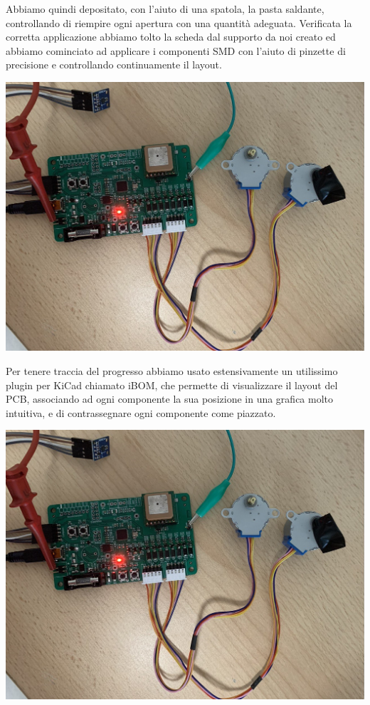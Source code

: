 \noindent Abbiamo quindi depositato, con l’aiuto di una spatola, la pasta saldante, controllando di riempire ogni apertura con una quantità adeguata. Verificata la corretta applicazione abbiamo tolto la scheda dal supporto da noi creato ed abbiamo cominciato ad applicare i componenti SMD con l’aiuto di pinzette di precisione e controllando continuamente il layout.

\begin{center}
\includegraphics[scale=0.35]{figures/image101.png}
\captionsetup{type=figure}
\end{center}

\noindent Per tenere traccia del progresso abbiamo usato estensivamente un utilissimo plugin per KiCad chiamato iBOM, che permette di visualizzare il layout del PCB, associando ad ogni componente la sua posizione in una grafica molto intuitiva, e di contrassegnare ogni componente come piazzato.

\begin{center}
\includegraphics[scale=0.35]{figures/image101.png}
\captionsetup{type=figure}
\end{center}

